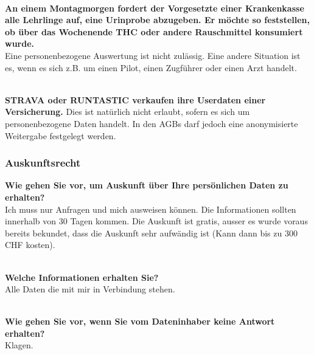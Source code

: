 \mbox{}\\
\textbf{An einem Montagmorgen fordert der Vorgesetzte einer Krankenkasse
alle Lehrlinge auf, eine Urinprobe abzugeben. Er möchte so feststellen,
ob über das Wochenende THC oder andere Rauschmittel konsumiert wurde.}\\
Eine personenbezogene Auswertung ist nicht zulässig. Eine andere
Situation ist es, wenn es sich z.B. um einen Pilot, einen Zugführer oder
einen Arzt handelt.

\mbox{}\\
\textbf{STRAVA oder RUNTASTIC verkaufen ihre Userdaten einer
Versicherung.} Dies ist natürlich nicht erlaubt, sofern es sich um
personenbezogene Daten handelt. In den AGBs darf jedoch eine
anonymisierte Weitergabe festgelegt werden.

\subsubsection{Auskunftsrecht}

\textbf{Wie gehen Sie vor, um Auskunft über Ihre persönlichen Daten zu
erhalten?}\\
Ich muss nur Anfragen und mich ausweisen können. Die Informationen
sollten innerhalb von 30 Tagen kommen. Die Auskunft ist gratis, ausser
es wurde voraus bereits bekundet, dass die Auskunft sehr aufwändig ist
(Kann dann bis zu 300 CHF kosten).

\mbox{}\\
\textbf{Welche Informationen erhalten Sie?}\\
Alle Daten die mit mir in Verbindung stehen.

\mbox{}\\
\textbf{Wie gehen Sie vor, wenn Sie vom Dateninhaber keine Antwort
erhalten?}\\
Klagen.
